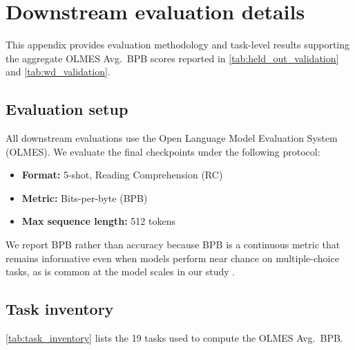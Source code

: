 \section{Downstream evaluation details}
\label{app:downstream}

This appendix provides evaluation methodology and task-level results supporting the aggregate OLMES Avg.\ BPB scores reported in \autoref{tab:held_out_validation} and \autoref{tab:wd_validation}.

\subsection{Evaluation setup}

All downstream evaluations use the Open Language Model Evaluation System (OLMES). We evaluate the final checkpoints under the following protocol:

\begin{itemize}
    \item \textbf{Format:} 5-shot, Reading Comprehension (RC)
    \item \textbf{Metric:} Bits-per-byte (BPB)
    \item \textbf{Max sequence length:} 512 tokens
\end{itemize}

We report BPB rather than accuracy because BPB is a continuous metric that remains informative even when models perform near chance on multiple-choice tasks, as is common at the model scales in our study \citep{heineman2025signal}.

\subsection{Task inventory}

\autoref{tab:task_inventory} lists the 19 tasks used to compute the OLMES Avg.\ BPB.

